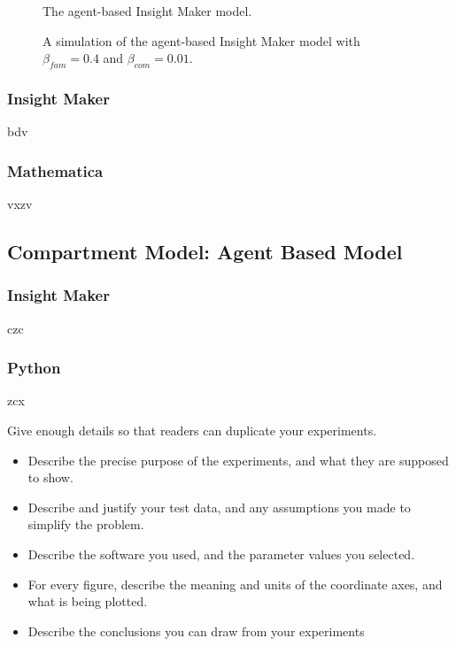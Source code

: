 \documentclass[10pt]{article}
\begin{document}
\begin{figure}
\caption{The agent-based Insight Maker model.}
\end{figure}

\begin{figure}
\caption{A simulation of the agent-based Insight Maker model with $\beta_{fam}=0.4$ and $\beta_{com}=0.01$.}
\end{figure}

\subsubsection{Insight Maker}
bdv

\subsubsection{Mathematica}
vxzv

\subsection{Compartment Model: Agent Based Model}


\subsubsection{Insight Maker}
czc

\subsubsection{Python}
zcx


Give enough details so that readers can duplicate your experiments.

\begin{itemize}
\item Describe the precise purpose of the experiments, and what they 
are supposed to show.

\item Describe and justify your test data, and any assumptions you made to 
simplify the problem.

\item Describe the software you used, and the 
parameter values you selected.

\item 
For every figure, describe the meaning and units of the coordinate axes, 
and what is being plotted.

\item Describe the conclusions you can draw from your experiments
\end{itemize}
%
%
%
%
%
%
%
%
%
\end{document}
